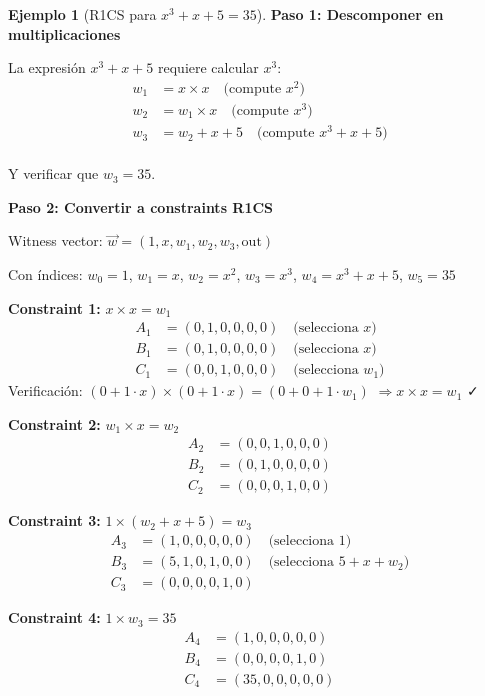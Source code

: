 \documentclass[11pt,a4paper,twoside,openright]{book}
\theoremstyle{definition}
\newtheorem{example}{Ejemplo}[chapter]
\theoremstyle{plain}
\theoremstyle{remark}
\begin{document}
\begin{example}[R1CS para $x^3 + x + 5 = 35$]
\textbf{Paso 1: Descomponer en multiplicaciones}

La expresión $x^3 + x + 5$ requiere calcular $x^3$:
\begin{align*}
w_1 &= x \times x \quad \text{(compute } x^2\text{)} \\
w_2 &= w_1 \times x \quad \text{(compute } x^3\text{)} \\
w_3 &= w_2 + x + 5 \quad \text{(compute } x^3 + x + 5\text{)} \\
\end{align*}

Y verificar que $w_3 = 35$.

\textbf{Paso 2: Convertir a constraints R1CS}

Witness vector: $\vec{w} = (1, x, w_1, w_2, w_3, \text{out})$

Con índices: $w_0 = 1$, $w_1 = x$, $w_2 = x^2$, $w_3 = x^3$, $w_4 = x^3+x+5$, $w_5 = 35$

\textbf{Constraint 1:} $x \times x = w_1$
\begin{align*}
A_1 &= (0, 1, 0, 0, 0, 0) \quad \text{(selecciona } x\text{)} \\
B_1 &= (0, 1, 0, 0, 0, 0) \quad \text{(selecciona } x\text{)} \\
C_1 &= (0, 0, 1, 0, 0, 0) \quad \text{(selecciona } w_1\text{)}
\end{align*}
Verificación: $(0 + 1 \cdot x) \times (0 + 1 \cdot x) = (0 + 0 + 1 \cdot w_1)$
$\Rightarrow x \times x = w_1$ ✓

\textbf{Constraint 2:} $w_1 \times x = w_2$
\begin{align*}
A_2 &= (0, 0, 1, 0, 0, 0) \\
B_2 &= (0, 1, 0, 0, 0, 0) \\
C_2 &= (0, 0, 0, 1, 0, 0)
\end{align*}

\textbf{Constraint 3:} $1 \times (w_2 + x + 5) = w_3$
\begin{align*}
A_3 &= (1, 0, 0, 0, 0, 0) \quad \text{(selecciona 1)} \\
B_3 &= (5, 1, 0, 1, 0, 0) \quad \text{(selecciona } 5 + x + w_2\text{)} \\
C_3 &= (0, 0, 0, 0, 1, 0)
\end{align*}

\textbf{Constraint 4:} $1 \times w_3 = 35$
\begin{align*}
A_4 &= (1, 0, 0, 0, 0, 0) \\
B_4 &= (0, 0, 0, 0, 1, 0) \\
C_4 &= (35, 0, 0, 0, 0, 0)
\end{align*}


\end{example}
\end{document}
